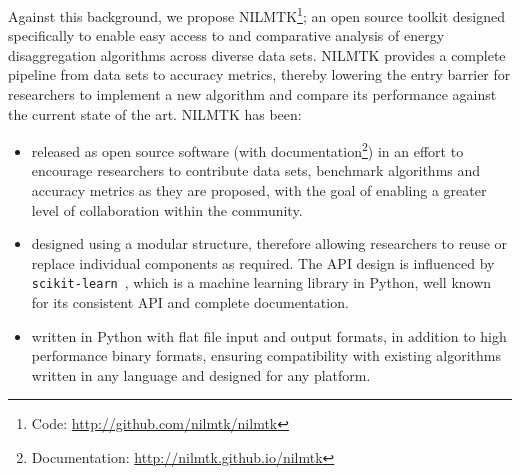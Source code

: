 \documentclass{sig-alternate}
\begin{document}
Against this background, we propose NILMTK\footnote{Code: \url{http://github.com/nilmtk/nilmtk}}; an open source toolkit designed specifically to enable easy access to and comparative analysis of energy disaggregation algorithms across diverse data sets. NILMTK provides a complete pipeline from data sets to accuracy metrics, thereby lowering the entry barrier for researchers to implement a new algorithm and compare its performance against the current state of the art. NILMTK has been:
\begin{itemize}
\item released as open source software (with documentation\footnote{Documentation: \url{http://nilmtk.github.io/nilmtk}}) in an effort to encourage researchers to contribute data sets, benchmark algorithms and accuracy metrics as they are proposed, with the goal of enabling a greater level of collaboration within the community. 
\item designed using a modular structure, therefore allowing researchers to reuse or replace individual components as required. The API design is influenced by \texttt{scikit-learn}~\cite{scikit}, which is a machine learning library in Python, well known for its consistent API and complete documentation.
\item written in Python with flat file input and output formats, in addition to high performance binary formats, ensuring compatibility with existing algorithms written in any language and designed for any platform.
\end{itemize}
\end{document}
